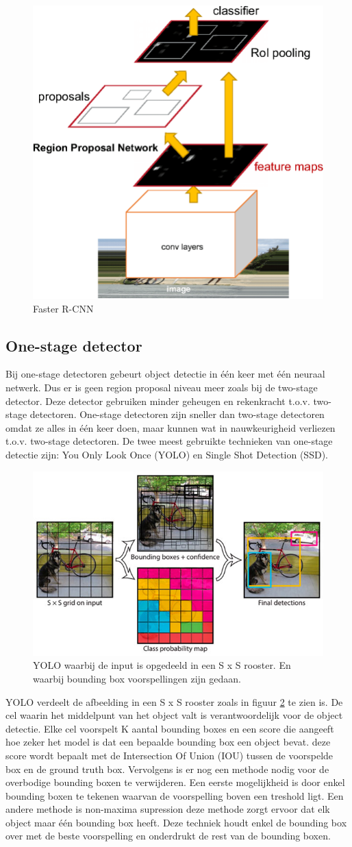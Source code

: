 \begin{figure}[!ht]
    \centering
 	\includegraphics[width=0.3\linewidth]{fig/Faster-R-CNN.png}
 	\caption{Faster R-CNN}
 	\label{fig:faster-r-cnn}
\end{figure}

\subsection{One-stage detector}
Bij one-stage detectoren gebeurt object detectie in \'e\'en keer met \'e\'en neuraal netwerk. 
Dus er is geen region proposal niveau meer zoals bij de two-stage detector. 
Deze detector gebruiken minder geheugen en rekenkracht t.o.v. two-stage detectoren.
One-stage detectoren zijn sneller dan two-stage detectoren omdat ze alles in \'e\'en keer doen, maar kunnen wat in nauwkeurigheid verliezen t.o.v. two-stage detectoren.
De twee meest gebruikte technieken van one-stage detectie zijn: You Only Look Once (YOLO) en Single Shot Detection (SSD).

\begin{figure}[!ht]
	\centering
	\includegraphics[width=0.60\linewidth]{fig/YOLO.jpg}
	\caption{YOLO waarbij de input is opgedeeld in een S x S rooster. 
	En waarbij bounding box voorspellingen zijn gedaan.}
	\label{fig:yolo}
\end{figure}

YOLO \cite{redmon_you_2016} verdeelt de afbeelding in een S x S rooster zoals in figuur \ref{fig:yolo} te zien is. 
De cel waarin het middelpunt van het object valt is verantwoordelijk voor de object detectie.
Elke cel voorspelt K aantal bounding boxes en een score die aangeeft hoe zeker het model is dat een bepaalde bounding box een object bevat.
deze score wordt bepaalt met de Intersection Of Union (IOU) tussen de voorspelde box en de ground truth box.
Vervolgens is er nog een methode nodig voor de overbodige bounding boxen te verwijderen. 
Een eerste mogelijkheid is door enkel bounding boxen te tekenen waarvan de voorspelling boven een treshold ligt. 
Een andere methode is non-maxima supression deze methode zorgt ervoor dat elk object maar \'e\'en bounding box heeft. 
Deze techniek houdt enkel de bounding box over met de beste voorspelling en onderdrukt de rest van de bounding boxen. 

